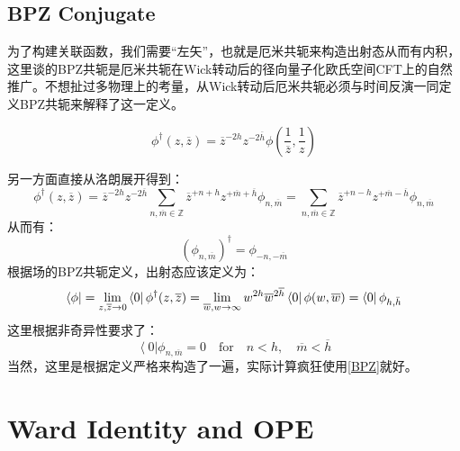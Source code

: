 \subsection{BPZ Conjugate}
为了构建关联函数，我们需要“左矢”，也就是厄米共轭来构造出射态从而有内积，这里谈的BPZ共轭是厄米共轭在Wick转动后的径向量子化欧氏空间CFT上的自然推广。不想扯过多物理上的考量，\cite{ito}从Wick转动后厄米共轭必须与时间反演一同定义BPZ共轭来解释了这一定义。
\begin{definition}
	\begin{equation}
		\phi^\dagger(z,\overline{z})=\overline{z}^{-2h}z^{-2\overline{h}}\phi\left(\frac{1}{\overline{z}},\frac{1}{z}\right)
	\end{equation}
\end{definition}
另一方面直接从洛朗展开得到：
\begin{equation}
	\phi^{\dagger}(z,\overline{z})=\overline{z}^{-2h}z^{-2\overline{h}}\sum_{n,\overline{m}\in\mathbb{Z}}\overline{z}^{+n+h}z^{+\overline{m}+\overline{h}}\phi_{n,\overline{m}}=\sum_{n,\overline{m}\in\mathbb{Z}}\overline{z}^{+n-h}z^{+\overline{m}-\overline{h}}\phi_{n,\overline{m}}
\end{equation}
从而有：
\begin{equation}\label{BPZ}
	\boxed{
	\left(\phi_{n,\overline{m}}\right)^\dagger=\phi_{-n,-\overline{m}}
	}
\end{equation}
根据场的BPZ共轭定义，出射态应该定义为：
\begin{equation}
	\bra{\phi}=\lim\limits_{z,\overline{z}\to0}\bra{ 0  }              \phi^\dagger(z,\overline{z})=\lim\limits_{\overline{w},w\to\infty}w^{2h}\overline{w}^{2\overline{h}}\bra{0}\phi(w,\overline{w})=\bra{0}\phi_{h,\bar h}
\end{equation}
这里根据非奇异性要求了：
\begin{equation}
	\left<0\right|\phi_{n,\overline{m}}=0\quad\text{for}\quad n<h,\quad\overline{m}<\overline{h}
\end{equation}
当然，这里是根据定义严格来构造了一遍，实际计算疯狂使用\ref{BPZ}就好。
\section{Ward Identity and OPE}